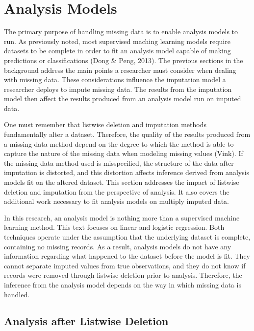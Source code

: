 \documentclass[12pt,oneside]{chicagocapstone}
\begin{document}
\section*{Analysis Models}\label{background-analysis}

The primary purpose of handling missing data is to enable analysis
models to run. As previously noted, most supervised maching learning
models require datasets to be complete in order to fit an analysis model
capable of making predictions or classifications (Dong \& Peng, 2013).
The previous sections in the background address the main points a
researcher must consider when dealing with missing data. These
considerations influence the imputation model a researcher deploys to
impute missing data. The results from the imputation model then affect
the results produced from an analysis model run on imputed data.

One must remember that listwise deletion and imputation methods
fundamentally alter a dataset. Therefore, the quality of the results
produced from a missing data method depend on the degree to which the
method is able to capture the nature of the missing data when modeling
missing values (Vink). If the missing data method used is misspecified,
the structure of the data after imputation is distorted, and this
distortion affects inference derived from analysis models fit on the
altered dataset. This section addresses the impact of listwise deletion
and imputation from the perspective of analysis. It also covers the
additional work necessary to fit analysis models on multiply imputed
data.

In this research, an analysis model is nothing more than a supervised
machine learning method. This text focuses on linear and logistic
regression. Both techniques operate under the assumption that the
underlying dataset is complete, containing no missing records. As a
result, analysis models do not have any information regarding what
happened to the dataset before the model is fit. They cannot separate
imputed values from true observations, and they do not know if records
were removed through listwise deletion prior to analysis. Therefore, the
inference from the analysis model depends on the way in which missing
data is handled.

\subsection*{Analysis after Listwise
Deletion}\label{background-analysis-listwise}
\end{document}
